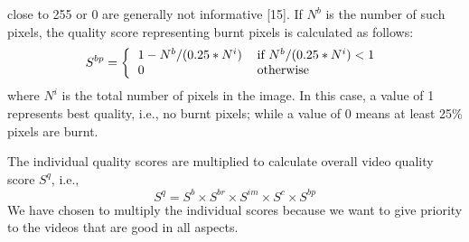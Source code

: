 \documentclass{sig-alternate}
\begin{document}
\begin{itemize}
close to 255 or 0 are generally not informative [15]. If $N^b$
is the number of such pixels, the quality score representing
burnt pixels is calculated as follows: 
\begin{equation}
    S^{bp} = \left\{\begin{tabular}{ll}$1-N^b/(0.25*N^i)$ & if$\ N^b/(0.25*N^i)<1$\\0 & otherwise\end{tabular}\right.
\end{equation}
where $N^i$ is the total number of pixels in the image. In this
case, a value of 1 represents best quality, i.e., no burnt pixels;
while a value of 0 means at least 25\% pixels are burnt.
\end{itemize}

The individual quality scores are multiplied to calculate overall
video quality score $S^q$, i.e.,
\begin{equation}
S^q = S^b \times S^{br} \times S^{im} \times S^c \times S^{bp}
\end{equation}
We have chosen to multiply the individual scores because we
want to give priority to the videos that are good in all aspects.
\end{document}
